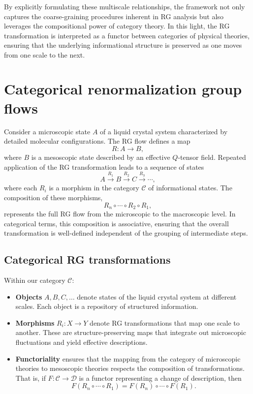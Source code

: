 By explicitly formulating these multiscale relationships, the framework not only captures the coarse-graining procedures inherent in RG analysis but also leverages the compositional power of category theory. In this light, the RG transformation is interpreted as a functor between categories of physical theories, ensuring that the underlying informational structure is preserved as one moves from one scale to the next.

\pagebreak
\section{Categorical renormalization group flows}

Consider a microscopic state \(A\) of a liquid crystal system characterized by detailed molecular configurations. The RG flow defines a map 
\[
R: A \to B,
\]
where \(B\) is a mesoscopic state described by an effective \(Q\)-tensor field. Repeated application of the RG transformation leads to a sequence of states
\[
A \xrightarrow{R_1} B \xrightarrow{R_2} C \xrightarrow{R_3} \cdots,
\]
where each \(R_i\) is a morphism in the category \(\mathcal{C}\) of informational states. The composition of these morphisms,
\[
R_{n} \circ \cdots \circ R_2 \circ R_1,
\]
represents the full RG flow from the microscopic to the macroscopic level. In categorical terms, this composition is associative, ensuring that the overall transformation is well-defined independent of the grouping of intermediate steps.

\subsection{Categorical RG transformations}

Within our category \(\mathcal{C}\):
\begin{itemize}
	\item \textbf{Objects} \(A, B, C, \dots\) denote states of the liquid crystal system at different scales. Each object is a repository of structured information.
	\item \textbf{Morphisms} \(R_i: X \to Y\) denote RG transformations that map one scale to another. These are structure-preserving maps that integrate out microscopic fluctuations and yield effective descriptions.
	\item \textbf{Functoriality} ensures that the mapping from the category of microscopic theories to mesoscopic theories respects the composition of transformations. That is, if \(F: \mathcal{C} \to \mathcal{D}\) is a functor representing a change of description, then 
	\[
	F(R_{n} \circ \cdots \circ R_1) = F(R_{n}) \circ \cdots \circ F(R_1).
	\]
\end{itemize}

